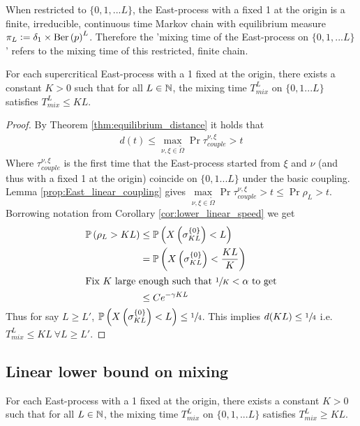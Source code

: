 \begin{remark}
When restricted to $\{0, 1, ... L\}$, the East-process with a fixed 1 at the origin is a finite, irreducible, continuous time Markov chain with equilibrium measure $\pi_L \vcentcolon= \delta_{1} \times \text{Ber} \left( p \right)^L$. Therefore the 'mixing time of the East-process on $\{0, 1, ... L\}$' refers to the mixing time of this restricted, finite chain. 
\end{remark}

\begin{theorem}
For each supercritical East-process with a 1 fixed at the origin, there exists a constant $K > 0$ such that for all $L \in \mathbb{N}$, the mixing time $T^L_{mix}$ on $\{0, 1 ... L\}$ satisfies $T^L_{mix} \leq KL$.  
\end{theorem}

\begin{proof}
By Theorem \ref{thm:equilibrium_distance} it holds that 
\begin{align}
d(t) \leq \max\limits_{\nu, \xi \in \widetilde{\Omega}} \Pr{ \tau^{\nu, \xi}_{couple} > t }
\end{align}
Where $\tau^{\nu, \xi}_{couple}$ is the first time that the East-process started from $\xi$ and $\nu$ (and thus with a fixed 1 at the origin) coincide on $\{0, 1 ... L\}$ under the basic coupling. Lemma \ref{prop:East_linear_coupling} gives $\max\limits_{\nu, \xi \in \widetilde{\Omega}} \Pr{\tau^{\nu, \xi}_{couple} > t } \leq \Pr{\rho_L > t}$. Borrowing notation from Corollary \ref{cor:lower_linear_speed} we get 
\begin{align*}
\mathbb{P} \left( \rho_L > KL \right) &\leq \mathbb{P} \left( X\left(\sigma^{\{0\}}_{KL}\right) < L \right) \\
                 &= \mathbb{P} \left( X\left(\sigma^{\{0\}}_{KL}\right) < \frac{KL}{K} \right) \\
  \intertext{Fix $K$ large enough such that $\sfrac{1}{K} < \alpha$ to get}
                 &\leq C e^{-\gamma K L}
\end{align*}
Thus for say $L \geq L'$, $\mathbb{P} \left( X\left(\sigma^{\{0\}}_{KL} \right) < L \right) \leq \sfrac{1}{4}$. This implies $d(KL) \leq \sfrac{1}{4}$ i.e. $T^L_{mix} \leq KL\ \forall L \geq L'$. 
\end{proof}

\subsection{Linear lower bound on mixing}
\begin{theorem}
For each East-process with a 1 fixed at the origin, there exists a constant $K > 0$ such that for all $L \in \mathbb{N}$, the mixing time $T^L_{mix}$ on $\{0, 1, ... L\}$ satisfies $T^L_{mix} \geq KL$.  
\end{theorem}

